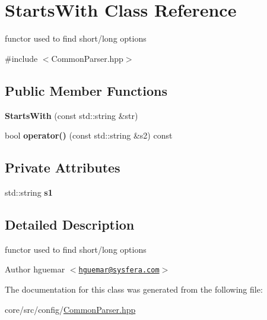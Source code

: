 \hypertarget{classStartsWith}{
\section{StartsWith Class Reference}
\label{classStartsWith}
}


functor used to find short/long options  




{\ttfamily \#include $<$CommonParser.hpp$>$}

\subsection*{Public Member Functions}
\begin{DoxyCompactItemize}
\item 
\hypertarget{classStartsWith_a77da87e1c3df7452d7a594ed0ab95d99}{
{\bfseries StartsWith} (const std::string \&str)}
\label{classStartsWith_a77da87e1c3df7452d7a594ed0ab95d99}

\item 
\hypertarget{classStartsWith_a4c64e9845fb2f12f0a2e6c934a3da90a}{
bool {\bfseries operator()} (const std::string \&s2) const }
\label{classStartsWith_a4c64e9845fb2f12f0a2e6c934a3da90a}

\end{DoxyCompactItemize}
\subsection*{Private Attributes}
\begin{DoxyCompactItemize}
\item 
\hypertarget{classStartsWith_a781aa01b213aa7a6ba5864c4853b1a85}{
std::string {\bfseries s1}}
\label{classStartsWith_a781aa01b213aa7a6ba5864c4853b1a85}

\end{DoxyCompactItemize}


\subsection{Detailed Description}
functor used to find short/long options \begin{DoxyAuthor}{Author}
hguemar $<$\href{mailto:hguemar@sysfera.com}{\tt hguemar@sysfera.com}$>$ 
\end{DoxyAuthor}


The documentation for this class was generated from the following file:\begin{DoxyCompactItemize}
\item 
core/src/config/\hyperlink{CommonParser_8hpp}{CommonParser.hpp}\end{DoxyCompactItemize}
